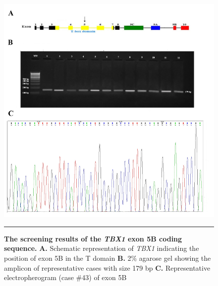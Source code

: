 \begin{refsection}
\begin{figure}[!thbp]
\centering
\includegraphics[width=\linewidth]{Figures/Figure4_6TBX5B.pdf}
\rule{35em}{0.5pt}
\caption{\textbf{The screening results of the \textit{TBX1} exon 5B coding sequence.}
\textbf{A.} Schematic representation of \textit{TBX1} indicating the position of exon 5B in the T domain \textbf{B.} 2\% agarose gel showing the amplicon of representative cases with size 179 bp \textbf{C.} Representative electropherogram (case \#43) of exon 5B}
\label{fig:4_6}
\end{figure}



\end{refsection}
